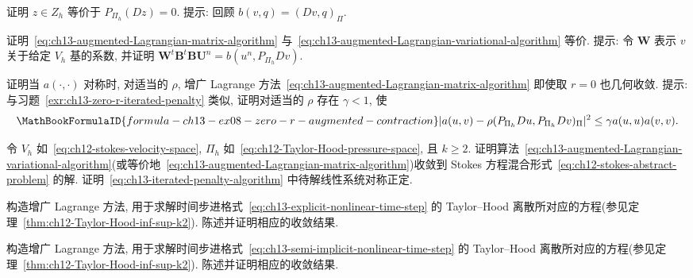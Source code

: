 \begin{MBExercise}
\label{exr:ch13-discrete-kernel-projection}
证明 $z\in Z_h$ 等价于 $P_{\Pi_h}(Dz)=0$. 提示: 回顾 $b(v,q)=(Dv,q)_\Pi$.
\end{MBExercise}

\begin{MBExercise}
\label{exr:ch13-augmented-variational-equivalence}
证明~\eqref{eq:ch13-augmented-Lagrangian-matrix-algorithm} 与~\eqref{eq:ch13-augmented-Lagrangian-variational-algorithm} 等价. 提示: 令 $\mathbf W$ 表示 $v$ 关于给定 $V_h$ 基的系数, 并证明
$\mathbf W^t\mathbf B^t\mathbf B\mathbf U^n=b(u^n,P_{\Pi_h}Dv)$.
\end{MBExercise}

\begin{MBExercise}
\label{exr:ch13-zero-r-augmented-Lagrangian}
证明当 $a(\cdot,\cdot)$ 对称时, 对适当的 $\rho$, 增广 Lagrange 方法~\eqref{eq:ch13-augmented-Lagrangian-matrix-algorithm} 即使取 $r=0$ 也几何收敛. 提示: 与习题~\ref{exr:ch13-zero-r-iterated-penalty} 类似, 证明对适当的 $\rho$ 存在 $\gamma<1$, 使
\[
\MathBookFormulaID{formula-ch13-ex08-zero-r-augmented-contraction}
|a(u,v)-\rho(P_{\Pi_h}Du,P_{\Pi_h}Dv)_\Pi|^2
\leq\gamma a(u,u)a(v,v).
\]
\end{MBExercise}

\begin{MBExercise}
\label{exr:ch13-Taylor-Hood-augmented-convergence}
令 $V_h$ 如~\eqref{eq:ch12-stokes-velocity-space}, $\Pi_h$ 如~\eqref{eq:ch12-Taylor-Hood-pressure-space}, 且 $k\geq2$. 证明算法~\eqref{eq:ch13-augmented-Lagrangian-variational-algorithm}(或等价地~\eqref{eq:ch13-augmented-Lagrangian-matrix-algorithm})收敛到 Stokes 方程混合形式~\eqref{eq:ch12-stokes-abstract-problem} 的解. 证明~\eqref{eq:ch13-iterated-penalty-algorithm} 中待解线性系统对称正定.
\end{MBExercise}

\begin{MBExercise}
\label{exr:ch13-Taylor-Hood-augmented-explicit}
构造增广 Lagrange 方法, 用于求解时间步进格式~\eqref{eq:ch13-explicit-nonlinear-time-step} 的 Taylor--Hood 离散所对应的方程(参见定理~\ref{thm:ch12-Taylor-Hood-inf-sup-k2}). 陈述并证明相应的收敛结果.
\end{MBExercise}

\begin{MBExercise}
\label{exr:ch13-Taylor-Hood-augmented-semi-implicit}
构造增广 Lagrange 方法, 用于求解时间步进格式~\eqref{eq:ch13-semi-implicit-nonlinear-time-step} 的 Taylor--Hood 离散所对应的方程(参见定理~\ref{thm:ch12-Taylor-Hood-inf-sup-k2}). 陈述并证明相应的收敛结果.
\end{MBExercise}
